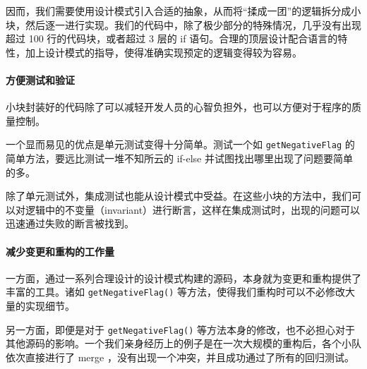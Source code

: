 因而，我们需要使用设计模式引入合适的抽象，从而将“揉成一团”的逻辑拆分成小块，然后逐一进行实现。我们的代码中，除了极少部分的特殊情况，几乎没有出现超过 100 行的代码块，或者超过 3 层的 if 语句。合理的顶层设计配合语言的特性，加上设计模式的指导，使得准确实现预定的逻辑变得较为容易。

\paragraph{方便测试和验证} 小块封装好的代码除了可以减轻开发人员的心智负担外，也可以方便对于程序的质量控制。

一个显而易见的优点是单元测试变得十分简单。测试一个如 \lstinline{getNegativeFlag} 的简单方法，要远比测试一堆不知所云的 if-else 并试图找出哪里出现了问题要简单的多。

除了单元测试外，集成测试也能从设计模式中受益。在这些小块的方法中，我们可以对逻辑中的不变量（invariant）进行断言，这样在集成测试时，出现的问题可以迅速通过失败的断言被找到。

\paragraph{减少变更和重构的工作量} 一方面，通过一系列合理设计的设计模式构建的源码，本身就为变更和重构提供了丰富的工具。诸如 \lstinline{getNegativeFlag()} 等方法，使得我们重构时可以不必修改大量的实现细节。

另一方面，即便是对于 \lstinline{getNegativeFlag()} 等方法本身的修改，也不必担心对于其他源码的影响。一个我们亲身经历上的例子是在一次大规模的重构后，各个小队依次直接进行了 merge ，没有出现一个冲突，并且成功通过了所有的回归测试。



